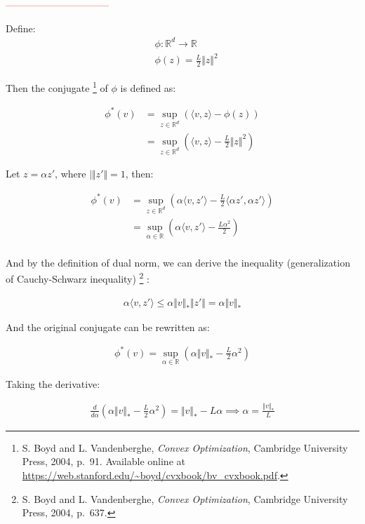 \documentclass{article}
\begin{document}
\textcolor{red}{--------------------------------}

Define: 
\begin{align*}
    &\phi: \mathbb{R}^d \to \mathbb{R} \\
    &\phi(z) = \frac{L}{2} \Vert z \Vert^2
\end{align*}

Then the conjugate
\footnote{S. Boyd and L. Vandenberghe, \textit{Convex Optimization}, Cambridge University Press, 2004, p.~91. 
Available online at \url{https://web.stanford.edu/~boyd/cvxbook/bv_cvxbook.pdf}.}
of $\phi$ is defined as:

\begin{align*}
    \phi^*(v) 
    &= \sup_{z \in \mathbb{R}^d} \left( \langle v, z \rangle - \phi(z) \right) \\
    &= \sup_{z \in \mathbb{R}^d} \left( \langle v, z \rangle - \frac{L}{2} \Vert z \Vert^2 \right)
\end{align*}

Let $z = \alpha z'$, where $|\Vert z'\Vert = 1$, then:

\begin{align*}
    \phi^*(v) 
    &= \sup_{z \in \mathbb{R}^d} \left( \alpha \langle v, z' \rangle - \frac{L}{2} \langle \alpha z', \alpha z' \rangle \right) \\
    &= \sup_{\alpha \in \mathbb{R}} \left( \alpha \langle v, z' \rangle - \frac{L \alpha^2}{2} \right) \\
\end{align*}

And by the definition of dual norm, we can derive the inequality (generalization of Cauchy-Schwarz inequality)
\footnote{S. Boyd and L. Vandenberghe, \textit{Convex Optimization}, Cambridge University Press, 2004, p.~637.}
:

\begin{align*}
    \alpha \langle v, z' \rangle \leq \alpha \Vert v \Vert_* \Vert z' \Vert = \alpha \Vert v \Vert_*
\end{align*}

And the original conjugate can be rewritten as:

\begin{align*}
    \phi^*(v) = \sup_{\alpha \in \mathbb{R}} \left( \alpha \Vert v \Vert_* - \frac{L}{2} \alpha^2 \right)
\end{align*}

Taking the derivative:

\begin{align*}
    \frac{d}{d\alpha} \left( \alpha \Vert v \Vert_* - \frac{L}{2} \alpha^2 \right) = \Vert v \Vert_* - L \alpha 
    \implies \alpha = \frac{\Vert v \Vert_*}{L}
\end{align*}
\end{document}
